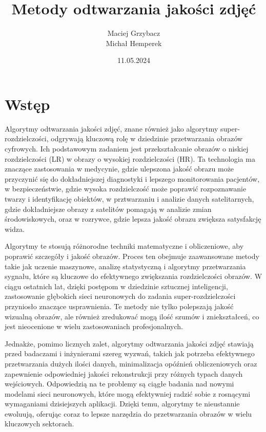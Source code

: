 \documentclass[10pt]{article}
\begin{document}
\title{Metody odtwarzania jakości zdjęć }


\author{Maciej Grzybacz \\ Michał Hemperek}
\date{11.05.2024}



\maketitle
\section*{Wstęp}
Algorytmy odtwarzania jakości zdjęć, znane również jako algorytmy super-\\rozdzielczości, odgrywają kluczową rolę w dziedzinie przetwarzania obrazów cyfrowych. Ich podstawowym zadaniem jest przekształcanie obrazów o niskiej rozdzielczości (LR) w obrazy o wysokiej rozdzielczości (HR). Ta technologia ma znaczące zastosowania w medycynie, gdzie ulepszona jakość obrazu może przyczynić się do dokładniejszej diagnostyki i lepszego monitorowania pacjentów, w bezpieczeństwie, gdzie wysoka rozdzielczość może poprawić rozpoznawanie twarzy i identyfikację obiektów, w prztwarzaniu i analizie danych satelitarnych, gdzie dokładniejsze obrazy z satelitów pomagają w analizie zmian środowiskowych, oraz w rozrywce, gdzie lepsza jakość obrazu zwiększa satysfakcję widza.

Algorytmy te stosują różnorodne techniki matematyczne i obliczeniowe, aby poprawić szczegóły i jakość obrazów. Proces ten obejmuje zaawansowane metody takie jak uczenie maszynowe, analizę statystyczną i algorytmy przetwarzania sygnału, które są kluczowe do efektywnego zwiększania rozdzielczości obrazów. W ciągu ostatnich lat, dzięki postępom w dziedzinie sztucznej inteligencji, zastosowanie głębokich sieci neuronowych do zadania super-rozdzielczości przyniosło znaczące usprawnienia. Te metody nie tylko polepszają jakość wizualną obrazów, ale również zredukować mogą ilość szumów i zniekształceń, co jest nieocenione w wielu zastosowaniach profesjonalnych.

Jednakże, pomimo licznych zalet, algorytmy odtwarzania jakości zdjęć stawiają przed badaczami i inżynierami szereg wyzwań, takich jak potrzeba efektywnego przetwarzania dużych ilości danych, minimalizacja opóźnień obliczeniowych oraz zapewnienie odpowiedniej jakości rekonstrukcji przy różnych typach danych wejściowych. Odpowiedzią na te problemy są ciągłe badania nad nowymi modelami sieci neuronowych, które mogą efektywniej radzić sobie z rosnącymi wymaganiami dzisiejszych aplikacji. Dzięki temu, algorytmy te nieustannie ewoluują, oferując coraz to lepsze narzędzia do przetwarzania obrazów w wielu kluczowych sektorach.
\end{document}
